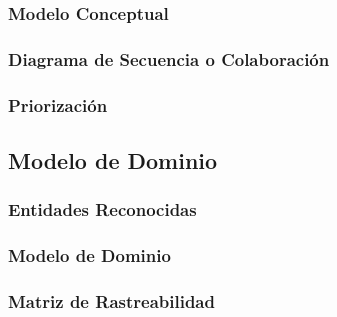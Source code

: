 \subsubsection{Modelo Conceptual}
\subsubsection{Diagrama de Secuencia o Colaboración}
\subsubsection{Priorización}

\subsection{Modelo de Dominio}
\subsubsection{Entidades Reconocidas}
\subsubsection{Modelo de Dominio}
\subsubsection{Matriz de Rastreabilidad}